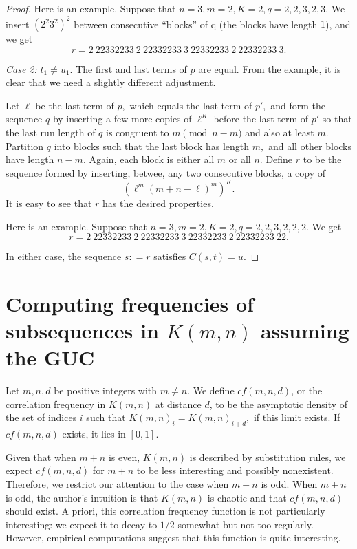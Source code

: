 \documentclass[11pt]{amsart} %
\begin{document}
\begin{proof}
 Here is an example. Suppose that $n = 3, m = 2, K = 2, q = 2,2,3,2,3.$  We insert $(2^2 3^2)^2$ between consecutive ``blocks'' of q (the blocks have length $1$), and we get 
 \[r = 2 \ 22332233 \ 2 \ 22332233 \ 3 \ 22332233 \ 2 \ 22332233 \ 3.\]
 
 
\textit{Case 2:} $t_1 \neq u_1.$ The first and last terms of $p$ are equal. From the example, it is clear that we need a slightly different adjustment.

Let $\ell$ be the last term of $p,$ which equals the last term of $p',$ and form the sequence $q$ by inserting a few more copies of $\ell^K$ before the last term of $p'$ so that the last run length of $q$ is congruent to $m \pmod{n-m}$ and also at least $m.$ Partition $q$ into blocks such that the last block has length $m,$ and all other blocks have length $n-m.$ Again, each block is either all $m$ or all $n.$ Define $r$ to be the sequence formed by inserting, betwee, any two consecutive blocks, a copy of 
 \[ \left(\ell^{m}(m+n-\ell)^{m} \right)^K. \] 
 It is easy to see that $r$ has the desired properties. 
 
 Here is an example. Suppose that $n = 3, m = 2, K = 2, q = 2,2,3,2,2,2.$ We get
 \[r = 2 \ 22332233 \ 2 \ 22332233 \ 3 \ 22332233 \ 2 \ 22332233 \ 22.\]

In either case, the sequence $s: = r$ satisfies $C(s, t) = u.$
\end{proof}






\section{Computing frequencies of subsequences in $K(m,n)$ assuming the GUC}
Let $m, n, d$ be positive integers with $m \neq n.$ We define $cf(m,n,d)$, or the correlation frequency in $K(m, n)$ at distance $d$, to be the asymptotic density of the set of indices $i$ such that $K(m, n)_i = K(m, n)_{i+d},$ if this limit exists.  If $cf(m, n, d)$ exists, it lies in $[0, 1]$.

Given that when $m+n$ is even, $K(m, n)$ is described by substitution rules, we expect $cf(m, n, d)$ for $m+n$ to be less interesting and possibly nonexistent. Therefore, we restrict our attention to the case when $m+n$ is odd. When $m+n$ is odd, the author's intuition is that $K(m, n)$ is chaotic and that $cf(m, n, d)$ should exist. A priori, this correlation frequency function is not particularly interesting: we expect it to decay to $1/2$ somewhat but not too regularly. However, empirical computations suggest that this function is quite interesting.
\end{document}
